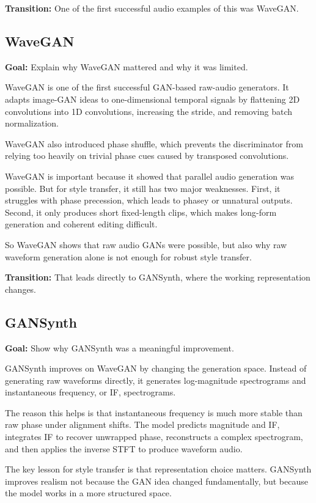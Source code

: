 \documentclass[11pt]{article}
\begin{document}
\textbf{Transition:} One of the first successful audio examples of this was WaveGAN.

\subsection*{WaveGAN}
\textbf{Goal:} Explain why WaveGAN mattered and why it was limited.

WaveGAN is one of the first successful GAN-based raw-audio generators. It adapts image-GAN ideas to one-dimensional temporal signals by flattening 2D convolutions into 1D convolutions, increasing the stride, and removing batch normalization.

WaveGAN also introduced phase shuffle, which prevents the discriminator from relying too heavily on trivial phase cues caused by transposed convolutions.

WaveGAN is important because it showed that parallel audio generation was possible. But for style transfer, it still has two major weaknesses. First, it struggles with phase precession, which leads to phasey or unnatural outputs. Second, it only produces short fixed-length clips, which makes long-form generation and coherent editing difficult.

So WaveGAN shows that raw audio GANs were possible, but also why raw waveform generation alone is not enough for robust style transfer.

\textbf{Transition:} That leads directly to GANSynth, where the working representation changes.

\subsection*{GANSynth}
\textbf{Goal:} Show why GANSynth was a meaningful improvement.

GANSynth improves on WaveGAN by changing the generation space. Instead of generating raw waveforms directly, it generates log-magnitude spectrograms and instantaneous frequency, or IF, spectrograms.

The reason this helps is that instantaneous frequency is much more stable than raw phase under alignment shifts. The model predicts magnitude and IF, integrates IF to recover unwrapped phase, reconstructs a complex spectrogram, and then applies the inverse STFT to produce waveform audio.

The key lesson for style transfer is that representation choice matters. GANSynth improves realism not because the GAN idea changed fundamentally, but because the model works in a more structured space.
\end{document}
